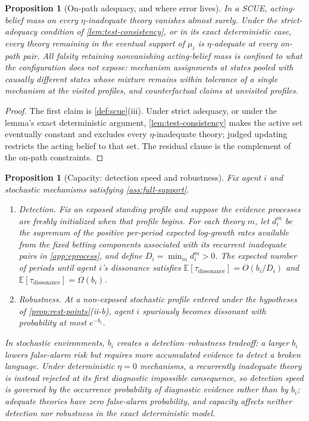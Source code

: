 \documentclass[11pt]{article}
\newtheorem{proposition}[assumption]{Proposition}
\theoremstyle{definition}
\begin{document}
\begin{proposition}[On-path adequacy, and where error lives]
\label{prop:adequacy}
In a SCUE, acting-belief mass on every $\eta$-inadequate theory vanishes almost surely.
Under the strict-adequacy condition of \cref{lem:test-consistency}, or in its exact deterministic case, every theory remaining in the eventual support of $\mu_i$ is $\eta$-adequate at every on-path pair.
All falsity retaining nonvanishing acting-belief mass is confined to what the configuration does not expose: mechanism assignments at states pooled with causally different states whose mixture remains within tolerance of a single mechanism at the visited profiles, and counterfactual claims at unvisited profiles.
\end{proposition}

\begin{proof}
The first claim is \cref{def:scue}(iii).
Under strict adequacy, or under the lemma's exact deterministic argument, \cref{lem:test-consistency} makes the active set eventually constant and excludes every $\eta$-inadequate theory; judged updating restricts the acting belief to that set.
The residual clause is the complement of the on-path constraints.
\end{proof}

\begin{proposition}[Capacity: detection speed and robustness]
\label{prop:capacity}
Fix agent $i$ and stochastic mechanisms satisfying \cref{ass:full-support}.
\begin{enumerate}[label=(\roman*)]
  \item \emph{Detection.} Fix an exposed standing profile and suppose the evidence processes are freshly initialized when that profile begins.
  For each theory $m$, let $d_i^m$ be the supremum of the positive per-period expected log-growth rates available from the fixed betting components associated with its recurrent inadequate pairs in \cref{app:eprocess}, and define $D_i=\min_m d_i^m>0$.
  The expected number of periods until agent $i$'s dissonance satisfies $\mathbb E[\tau_{\mathrm{dissonance}}]=O(b_i/D_i)$ and $\mathbb E[\tau_{\mathrm{dissonance}}]=\Omega(b_i)$.
  \item \emph{Robustness.} At a non-exposed stochastic profile entered under the hypotheses of \cref{prop:rest-points}(ii-b), agent $i$ spuriously becomes dissonant with probability at most $e^{-b_i}$.
\end{enumerate}
In stochastic environments, $b_i$ creates a detection--robustness tradeoff: a larger $b_i$ lowers false-alarm risk but requires more accumulated evidence to detect a broken language.
Under deterministic $\eta=0$ mechanisms, a recurrently inadequate theory is instead rejected at its first diagnostic impossible consequence, so detection speed is governed by the occurrence probability of diagnostic evidence rather than by $b_i$; adequate theories have zero false-alarm probability, and capacity affects neither detection nor robustness in the exact deterministic model.
\end{proposition}
\end{document}
